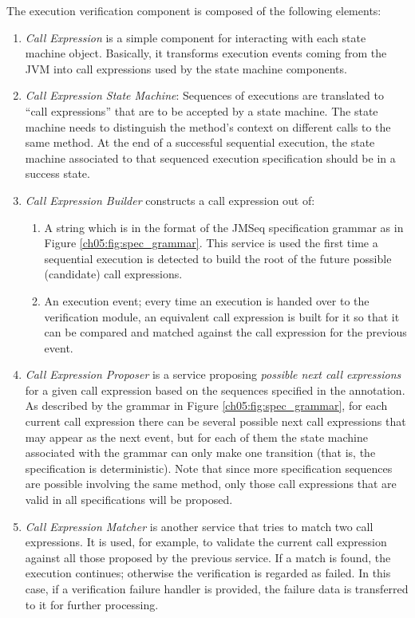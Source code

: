 The execution verification component is composed of the following elements:
\begin{enumerate}
  \item \textsl{Call Expression} is a simple component for interacting with each
  state machine object. Basically, it transforms execution events coming from
  the JVM into call expressions used by the state machine components.
  \item \textsl{Call Expression State Machine}: Sequences of
  executions are translated to ``call expressions'' that are to be accepted by
  a state machine. The state machine needs to distinguish the
  method's context on different calls to the same method. At the
  end of a successful sequential execution, the state machine associated to that
  sequenced execution specification should be in a success state. 
  \item \textsl{Call Expression Builder} constructs a call expression out of:
  \begin{enumerate}
    \item A string which is in the format of the JMSeq specification grammar as
    in Figure \ref{ch05:fig:spec_grammar}. This service is used the first time a
    sequential execution is detected to build the root of the future possible
    (candidate) call expressions.
    \item An execution event; every time an execution is handed over to the
    verification module, an equivalent  call expression is built for it so
    that it can be compared and matched against the call expression for the
    previous event.
  \end{enumerate}
  \item \textsl{Call Expression Proposer} is a service proposing \textit{possible
  next call expressions} for a given call expression based on the sequences specified
  in the annotation. As described by the grammar in Figure
  \ref{ch05:fig:spec_grammar}, for each current call expression there can
  be several possible next call expressions that may appear as the next event, but for
  each of them the state machine associated with the grammar can only make one
  transition (that is, the specification is deterministic). Note that since more specification sequences are possible involving
  the same method, only those call expressions that are valid in all
  specifications will be proposed.
  \item \textsl{Call Expression Matcher} is another service that
  tries to match two call expressions. It is used, for example, to validate
  the current call expression against all those proposed by the previous service.
  If a match is found, the execution continues; otherwise the verification is regarded as
  failed. In this case, if a verification failure handler is provided, the failure data is
  transferred to it for further processing.
\end{enumerate}

